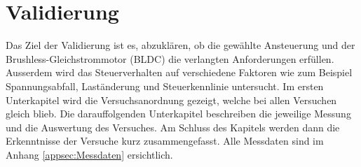 \section{Validierung}\label{sec:Validierung}
Das Ziel der Validierung ist es, abzuklären, ob die gewählte Ansteuerung und der Brushless-Gleichstrommotor (BLDC) die verlangten Anforderungen erfüllen. Ausserdem wird das Steuerverhalten auf verschiedene Faktoren wie zum Beispiel Spannungsabfall, Laständerung und Steuerkennlinie untersucht.
Im ersten Unterkapitel wird die Versuchsanordnung gezeigt, welche bei allen Versuchen gleich blieb. Die darauffolgenden Unterkapitel beschreiben die jeweilige Messung und die Auswertung des Versuches. Am Schluss des Kapitels werden dann die Erkenntnisse der Versuche kurz zusammengefasst.
Alle Messdaten sind im Anhang \ref{appsec:Messdaten} ersichtlich.













